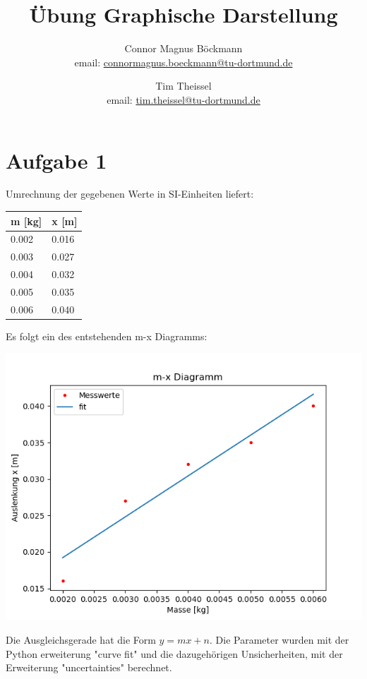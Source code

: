 \documentclass[titlepage=firstcover, captions=tableheading]{scrartcl}
\title{Übung Graphische Darstellung}
\author{
Connor Magnus Böckmann \\ email: \href{mailto:connormagnus.boeckmann@tu-dortmund.de}{connormagnus.boeckmann@tu-dortmund.de}
\and Tim Theissel \\ email: \href{mailto:tim.theissel@tu-dortmund.de}{tim.theissel@tu-dortmund.de}  
}
\begin{document}
\maketitle
\newpage
\tableofcontents
\newpage


\section{Aufgabe 1}

Umrechnung der gegebenen Werte in SI-Einheiten liefert:

\begin{center}
    \begin{tabular}{ll}
        \toprule
        m [kg] & x [m] \\
        \midrule
        0.002 &  0.016 \\ 
        0.003 &  0.027 \\ 
        0.004 &  0.032 \\ 
        0.005 &  0.035 \\ 
        0.006 &  0.040  \\
        \bottomrule 
    \end{tabular}
\end{center}

\noindent Es folgt ein des entstehenden m-x Diagramms:


\includegraphics{1.png}

\noindent Die Ausgleichsgerade hat die Form $y=mx+n$.
Die Parameter wurden mit der Python erweiterung "curve fit" und die dazugehörigen Unsicherheiten,
mit der Erweiterung "uncertainties" berechnet.
\end{document}
